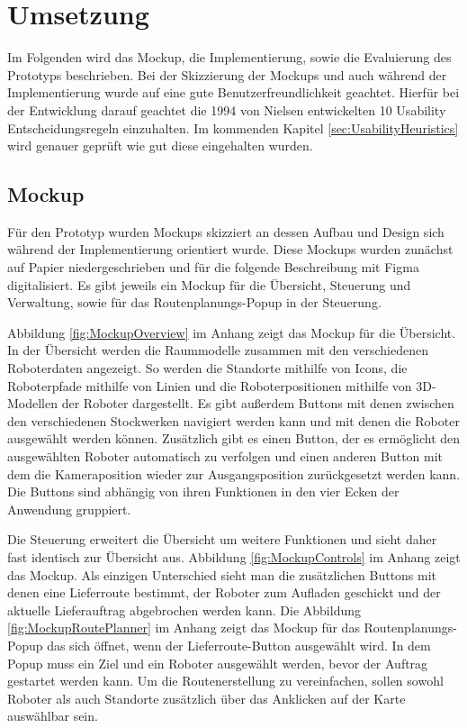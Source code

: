 
\newpage
\section{Umsetzung}
Im Folgenden wird das Mockup, die Implementierung, sowie die Evaluierung des Prototyps beschrieben. Bei der Skizzierung der Mockups und auch während der Implementierung wurde auf eine gute Benutzerfreundlichkeit geachtet. Hierfür bei der Entwicklung darauf geachtet die 1994 von Nielsen entwickelten 10 Usability Entscheidungsregeln \cite{Nielsen.1994} einzuhalten. Im kommenden Kapitel \ref{sec:UsabilityHeuristics} wird genauer geprüft wie gut diese eingehalten wurden.

\subsection{Mockup}\label{sec:Mockup}
Für den Prototyp wurden Mockups skizziert an dessen Aufbau und Design sich während der Implementierung orientiert wurde. Diese Mockups wurden zunächst auf Papier niedergeschrieben und für die folgende Beschreibung mit Figma \cite{Figma} digitalisiert. Es gibt jeweils ein Mockup für die Übersicht, Steuerung und Verwaltung, sowie für das Routenplanungs-Popup in der Steuerung.

Abbildung \ref{fig:MockupOverview} im Anhang zeigt das Mockup für die Übersicht. In der Übersicht werden die Raummodelle zusammen mit den verschiedenen Roboterdaten angezeigt. So werden die Standorte mithilfe von Icons, die Roboterpfade mithilfe von Linien und die Roboterpositionen mithilfe von 3D-Modellen der Roboter dargestellt. Es gibt außerdem Buttons mit denen zwischen den verschiedenen Stockwerken navigiert werden kann und mit denen die Roboter ausgewählt werden können. Zusätzlich gibt es einen Button, der es ermöglicht den ausgewählten Roboter automatisch zu verfolgen und einen anderen Button mit dem die Kameraposition wieder zur Ausgangsposition zurückgesetzt werden kann. Die Buttons sind abhängig von ihren Funktionen in den vier Ecken der Anwendung gruppiert.

Die Steuerung erweitert die Übersicht um weitere Funktionen und sieht daher fast identisch zur Übersicht aus. Abbildung \ref{fig:MockupControls} im Anhang  zeigt das Mockup. Als einzigen Unterschied sieht man die zusätzlichen Buttons mit denen eine Lieferroute bestimmt, der Roboter zum Aufladen geschickt und der aktuelle Lieferauftrag abgebrochen werden kann. Die Abbildung \ref{fig:MockupRoutePlanner} im Anhang zeigt das Mockup für das Routenplanungs-Popup das sich öffnet, wenn der Lieferroute-Button ausgewählt wird. In dem Popup muss ein Ziel und ein Roboter ausgewählt werden, bevor der Auftrag gestartet werden kann. 
Um die Routenerstellung zu vereinfachen, sollen sowohl Roboter als auch Standorte zusätzlich über das Anklicken auf der Karte auswählbar sein.

